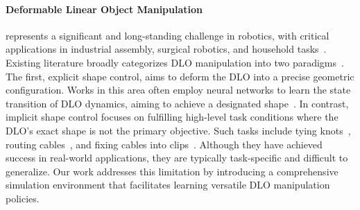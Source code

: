 \paragraph{Deformable Linear Object Manipulation} 
represents a significant and long-standing challenge in robotics, with critical applications in industrial assembly, surgical robotics, and household tasks~\citep{saha2006motion,lee2021sample,laezza2021learning,yu2022global,lv2022dynamic,zhaole2024dexdlo,li2025gr}. Existing literature broadly categorizes DLO manipulation into two paradigms~\citep{laezza2021learning,laezza2021reform,monguzzi2023robotic}.
The first, explicit shape control, aims to deform the DLO into a precise geometric configuration. Works in this area often employ neural networks to learn the state transition of DLO dynamics, aiming to achieve a designated shape~\citep{yan2020self,wang2022offline,chendifferentiable}. In contrast, implicit shape control focuses on fulfilling high-level task conditions where the DLO's exact shape is not the primary objective. Such tasks include tying knots~\citep{saha2006motion}, routing cables~\citep{luo2024multistage}, and fixing cables into clips~\citep{li2018vision}.
Although they have achieved success in real-world applications, they are typically task-specific and difficult to generalize. Our work addresses this limitation by introducing a comprehensive simulation environment that facilitates learning versatile DLO manipulation policies.

